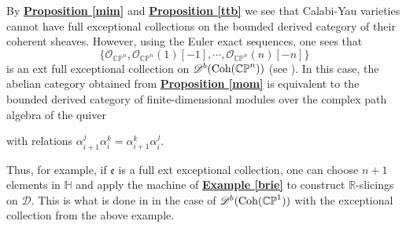 \begin{exmp}\label{kuzz}
By \hyperref[mim]{\textbf{Proposition \ref*{mim}}} and \hyperref[ttb]{\textbf{Proposition \ref*{ttb}}} we see that Calabi-Yau varieties cannot have full exceptional collections on the bounded derived category of their coherent sheaves. However, using the Euler exact sequences, one sees that $$\{ \mathcal{O}_{\mathbb{CP}^n}, \mathcal{O}_{\mathbb{CP}^n}(1)[-1], \cdots, \mathcal{O}_{\mathbb{CP}^n}(n)[-n] \}$$ is an ext full exceptional collection on $\mathscr{D}^b(\textnormal{Coh}(\mathbb{CP}^n))$ (see \cite{hel}). In this case, the abelian category obtained from \hyperref[mom]{\textbf{Proposition \ref*{mom}}} is equivalent to the bounded derived category of finite-dimensional modules over the complex path algebra of the quiver 
\begin{center}
\end{center}
with relations $\alpha_{i+1}^j \alpha_i^k=\alpha_{i+1}^k\alpha_i^j$.
\end{exmp}

Thus, for example, if $\mathfrak{e}$ is a full ext exceptional collection, one can choose $n+1$ elements in $\mathbb{H}$ and apply the machine of \hyperref[brie]{\textbf{Example \ref*{brie}}} to construct $\mathbb{R}$-slicings on $\mathscr{D}$. This is what is done in \cite{mac} in the case of $\mathscr{D}^b(\textnormal{Coh}(\mathbb{CP}^1))$ with the exceptional collection from the above example.

